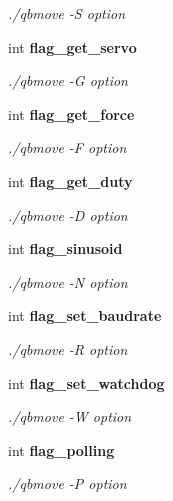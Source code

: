 \begin{DoxyCompactItemize}
\begin{DoxyCompactList}\small\item\em ./qbmove -\/S option \end{DoxyCompactList}\item 
\mbox{\label{structglobal__args_a8e7f619fb332291848bceae1fef502f1}} 
int \textbf{ flag\+\_\+get\+\_\+servo}
\begin{DoxyCompactList}\small\item\em ./qbmove -\/G option \end{DoxyCompactList}\item 
\mbox{\label{structglobal__args_abda0b0b3f5ad08a7fe15bb29b5de123b}} 
int \textbf{ flag\+\_\+get\+\_\+force}
\begin{DoxyCompactList}\small\item\em ./qbmove -\/F option \end{DoxyCompactList}\item 
\mbox{\label{structglobal__args_ac6a0f577c519bd619725257c46c8e100}} 
int \textbf{ flag\+\_\+get\+\_\+duty}
\begin{DoxyCompactList}\small\item\em ./qbmove -\/D option \end{DoxyCompactList}\item 
\mbox{\label{structglobal__args_a6b371b126c5346f512bcb9f3700213c7}} 
int \textbf{ flag\+\_\+sinusoid}
\begin{DoxyCompactList}\small\item\em ./qbmove -\/N option \end{DoxyCompactList}\item 
\mbox{\label{structglobal__args_aeb7e77450221e7de1da5ae0701a8c7af}} 
int \textbf{ flag\+\_\+set\+\_\+baudrate}
\begin{DoxyCompactList}\small\item\em ./qbmove -\/R option \end{DoxyCompactList}\item 
\mbox{\label{structglobal__args_a5416bb93d203c57a7fc6fe93957f5c14}} 
int \textbf{ flag\+\_\+set\+\_\+watchdog}
\begin{DoxyCompactList}\small\item\em ./qbmove -\/W option \end{DoxyCompactList}\item 
\mbox{\label{structglobal__args_ab4fab167b07a819ebd9cdff9d9c232b0}} 
int \textbf{ flag\+\_\+polling}
\begin{DoxyCompactList}\small\item\em ./qbmove -\/P option \end{DoxyCompactList}\item 

\end{DoxyCompactItemize}
